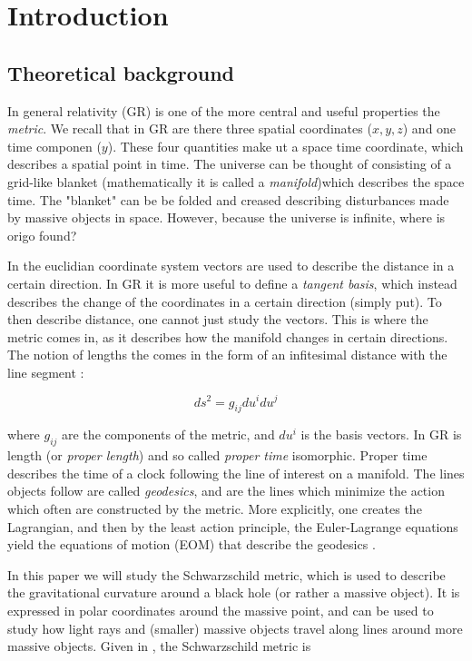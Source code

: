 \section{Introduction}\label{sec:introduction}

\subsection{Theoretical background}

In general relativity (GR) is one of the more central and useful properties the \textit{metric}. We recall that in GR are there three spatial coordinates ($x, y, z$) and one time componen ($y$). These four quantities make ut a space time coordinate, which describes a spatial point in time. The universe can be thought of consisting of a grid-like blanket (mathematically it is called a \textit{manifold})which describes the space time. The "blanket" can be be folded and creased describing disturbances made by massive objects in space. However, because the universe is infinite, where is origo found?

In the euclidian coordinate system vectors are used to describe the distance in a certain direction. In GR it is more useful to define a \textit{tangent basis}, which instead describes the change of the coordinates in a certain direction (simply put). To then describe distance, one cannot just study the vectors. This is where the metric comes in, as it describes how the manifold changes in certain directions. The notion of lengths the comes in the form of an infitesimal distance with the line segment \cite{guidry_2019}:

\begin{equation}
	ds^2 = g_{ij} du^i du^j
\end{equation}

where $g_{ij}$ are the components of the metric, and $du^i$ is the basis vectors. In GR is length (or \textit{proper length}) and so called \textit{proper time} isomorphic. Proper time describes the time of a clock following the line of interest on a manifold. The lines objects follow are called \textit{geodesics}, and are the lines which minimize the action which often are constructed by the metric. More explicitly, one creates the Lagrangian, and then by the least action principle, the Euler-Lagrange equations yield the equations of motion (EOM) that describe the geodesics \cite{guidry_2019}. 

In this paper we will study the Schwarzschild metric, which is used to describe the gravitational curvature around a black hole (or rather a massive object). It is expressed in polar coordinates around the massive point, and can be used to study how light rays and (smaller) massive objects travel along lines around more massive objects. Given in \cite{gould_2007, guidry_2019}, the Schwarzschild metric is

